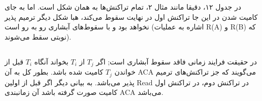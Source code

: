 \documentclass[a4paper]{article}
\begin{document}
در جدول ۱۲، دقیقا مانند مثال ۲، تمام تراکنش‌ها به همان شکل است. اما به جای کامیت
شدن در این جا تراکنش اول در نهایت سقوط می‌کند، هبا شکل دیگر ترمیم پذیر نخواهد
بود و با سقوط‌های آبشاری رو به رو است (اشاره به عملیات R(A) و R(B) که نوبتی سقط
می‌شوند).

\begin{LTR}
    \begin{table}[h]
        \centering
        \begin{RTL}
            \caption{بررسی سقوط‌های آبشاری در مثال ۲}
        \end{RTL}
    \end{table}
\end{LTR}

\newpage

\subsection{}

در حقیقت فرایند زمانی فاقد سقوط آبشاری است; اگر $T_{j}$ از $T_{i}$ بخواند آنگاه
$T_{i}$ قبل از خواندن $T_{j}$ کامیت شده باشد. بطور کل به آن ACA می‌گویند که جز
تراکنش‌های ترمیم پذیر می‌باشد. به بیانی دیگر اگر قبل از اولین Read در تراکنش
دوم، در تراکنش اول کامیت صورت گرفته باشد آن زمانبندی ACA می‌باشد.

\begin{LTR}
    \begin{table}[h]
        \centering
        \begin{RTL}
            \caption{نمونه‌ای از فرایند ACA}
        \end{RTL}
    \end{table}
\end{LTR}
\end{document}
